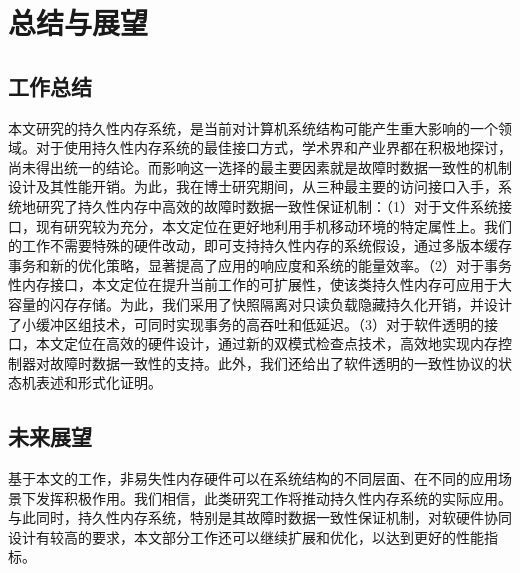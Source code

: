 \chapter{总结与展望}
\label{chap:conclusion}

\section{工作总结}

本文研究的持久性内存系统，是当前对计算机系统结构可能产生重大影响的一个领域。对于使用持久性内存系统的最佳接口方式，学术界和产业界都在积极地探讨，尚未得出统一的结论。而影响这一选择的最主要因素就是故障时数据一致性的机制设计及其性能开销。为此，我在博士研究期间，从三种最主要的访问接口入手，系统地研究了持久性内存中高效的故障时数据一致性保证机制：（1）对于文件系统接口，现有研究较为充分，本文定位在更好地利用手机移动环境的特定属性上。我们的工作不需要特殊的硬件改动，即可支持持久性内存的系统假设，通过多版本缓存事务和新的优化策略，显著提高了应用的响应度和系统的能量效率。（2）对于事务性内存接口，本文定位在提升当前工作的可扩展性，使该类持久性内存可应用于大容量的闪存存储。为此，我们采用了快照隔离对只读负载隐藏持久化开销，并设计了小缓冲区组技术，可同时实现事务的高吞吐和低延迟。（3）对于软件透明的接口，本文定位在高效的硬件设计，通过新的双模式检查点技术，高效地实现内存控制器对故障时数据一致性的支持。此外，我们还给出了软件透明的一致性协议的状态机表述和形式化证明。

\section{未来展望}

基于本文的工作，非易失性内存硬件可以在系统结构的不同层面、在不同的应用场景下发挥积极作用。我们相信，此类研究工作将推动持久性内存系统的实际应用。与此同时，持久性内存系统，特别是其故障时数据一致性保证机制，对软硬件协同设计有较高的要求，本文部分工作还可以继续扩展和优化，以达到更好的性能指标。
